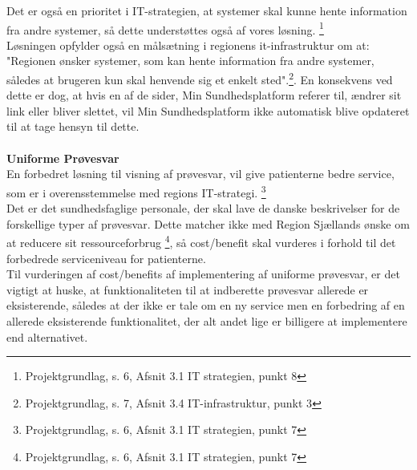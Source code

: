 Det er også en prioritet i IT-strategien, at systemer skal kunne hente information fra andre systemer, så dette understøttes også af vores løsning. \footnote{Projektgrundlag, s. 6, Afsnit 3.1 IT strategien, punkt 8} \\
Løsningen opfylder også en målsætning i regionens it-infrastruktur om at: "Regionen ønsker systemer, som kan hente information fra andre systemer, således at brugeren kun skal henvende sig et enkelt sted".\footnote{Projektgrundlag, s. 7, Afsnit 3.4 IT-infrastruktur, punkt 3}. En konsekvens ved dette er dog, at hvis en af de sider, Min Sundhedsplatform referer til, ændrer sit link eller bliver slettet, vil Min Sundhedsplatform ikke automatisk blive opdateret til at tage hensyn til dette. 
\\\\
\textbf{Uniforme Prøvesvar}\\ %
En forbedret løsning til visning af prøvesvar, vil give patienterne bedre service, som er i overensstemmelse med regions IT-strategi. \footnote{Projektgrundlag, s. 6, Afsnit 3.1 IT strategien, punkt 7}\\
Det er det sundhedsfaglige personale, der skal lave de danske beskrivelser for de forskellige typer af prøvesvar. Dette matcher ikke med Region Sjællands ønske om at reducere sit ressourceforbrug \footnote{Projektgrundlag, s. 6, Afsnit 3.1 IT strategien, punkt 7}, så cost/benefit skal vurderes i forhold til det forbedrede serviceniveau for patienterne.\\
Til vurderingen af cost/benefits af implementering af uniforme prøvesvar, er det vigtigt at huske, at funktionaliteten til at indberette prøvesvar allerede er eksisterende, således at der ikke er tale om en ny service men en forbedring af en allerede eksisterende funktionalitet, der alt andet lige er billigere at implementere end alternativet.
